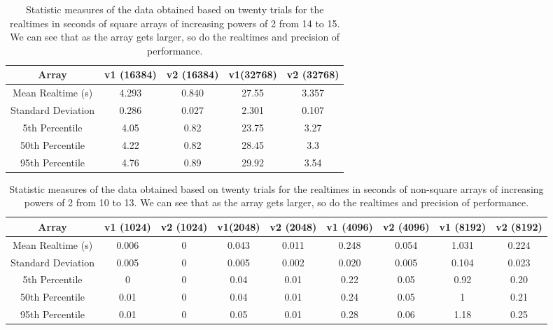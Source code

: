 \documentclass[a4paper]{article}
\begin{document}
\begin{table}[H]
\centering
\begin{tabular}{|c|c|c|c|c|}
\hline
Array & v1 (16384) & v2 (16384) & v1(32768) & v2 (32768)\\\hline
Mean Realtime (s) & 4.293 & 0.840 & 27.55 & 3.357 \\\hline
Standard Deviation & 0.286 & 0.027 & 2.301 & 0.107 \\\hline
5th Percentile & 4.05 & 0.82 & 23.75 & 3.27 \\\hline
50th Percentile & 4.22 & 0.82 & 28.45 & 3.3 \\\hline
95th Percentile & 4.76 & 0.89 & 29.92 & 3.54 \\\hline
\end{tabular}
\caption{\label{tab:widgets}Statistic measures of the data obtained based on twenty trials for the realtimes in seconds of square arrays of increasing powers of 2 from 14 to 15. We can see that as the array gets larger, so do the realtimes and precision of performance.}
\end{table}


\begin{table}[H]
\centering
\begin{tabular}{|c|c|c|c|c|c|c|c|c|}
\hline
Array & v1 (1024) & v2 (1024) & v1(2048) & v2 (2048) & v1 (4096) & v2 (4096) & v1 (8192) & v2 (8192)\\\hline
Mean Realtime (s) & 0.006 & 0 & 0.043 & 0.011 & 0.248 & 0.054 & 1.031 & 0.224 \\\hline
Standard Deviation & 0.005 & 0 & 0.005 & 0.002 & 0.020 & 0.005 & 0.104 & 0.023\\\hline
5th Percentile & 0 & 0 & 0.04 & 0.01 & 0.22 & 0.05 & 0.92 & 0.20 \\\hline
50th Percentile & 0.01 & 0 & 0.04 & 0.01 & 0.24 & 0.05 & 1 & 0.21 \\\hline
95th Percentile & 0.01 & 0 & 0.05 & 0.01 & 0.28 & 0.06 & 1.18 & 0.25 \\\hline
\end{tabular}
\caption{\label{tab:widgets}Statistic measures of the data obtained based on twenty trials for the realtimes in seconds of non-square arrays of increasing powers of 2 from 10 to 13. We can see that as the array gets larger, so do the realtimes and precision of performance.}
\end{table}
\end{document}
